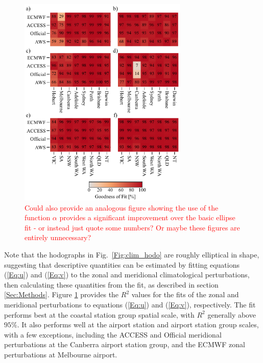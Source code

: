 \documentclass{ametsoc}
\begin{document}
\begin{figure}
\centering
\includegraphics[width=19pc]{r_squared.pdf}
\caption{\textcolor{red}{Could also provide an analogous figure showing the use of the function $\alpha$ provides a significant improvement over the basic ellipse fit - or instead just quote some numbers? Or maybe these figures are entirely unnecessary?}}
\label{Fig:r_squared}
\end{figure}

Note that the hodographs in Fig.~\ref{Fig:clim_hodo} are roughly elliptical in shape, suggesting that descriptive quantities can be estimated by fitting equations (\ref{Eq:u}) and (\ref{Eq:v}) to the zonal and meridional climatological perturbations, then calculating these quantities from the fit, as described in section \ref{Sec:Methods}. Figure \ref{Fig:r_squared} provides the $R^2$ values for the fits of the zonal and meridional perturbations to equations (\ref{Eq:u}) and (\ref{Eq:v}), respectively. The fit performs best at the coastal station group spatial scale, with $R^2$ generally above $95\%$. It also performs well at the airport station and airport station group scales, with a few exceptions, including the ACCESS and Official meridional perturbations at the Canberra airport station group, and the ECMWF zonal perturbations at Melbourne airport. 
\end{document}
